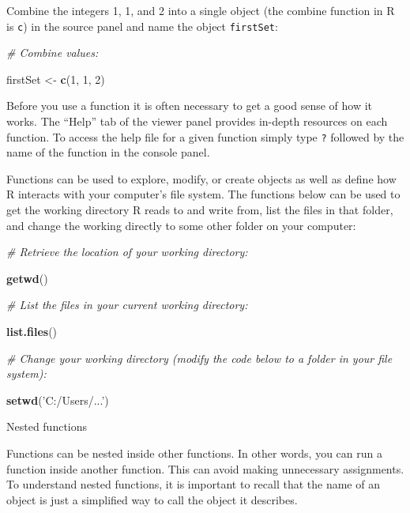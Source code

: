 \documentclass[]{article}
\newenvironment{Shaded}{\begin{snugshade}}{\end{snugshade}}
\newcommand{\KeywordTok}[1]{\textcolor[rgb]{0.13,0.29,0.53}{\textbf{#1}}}
\newcommand{\DecValTok}[1]{\textcolor[rgb]{0.00,0.00,0.81}{#1}}
\newcommand{\StringTok}[1]{\textcolor[rgb]{0.31,0.60,0.02}{#1}}
\newcommand{\CommentTok}[1]{\textcolor[rgb]{0.56,0.35,0.01}{\textit{#1}}}
\newcommand{\NormalTok}[1]{#1}
\begin{document}
 Combine the integers 1, 1, and 2 into a single object (the combine
function in R is \texttt{c}) in the source panel and name the object
\texttt{firstSet}:

\begin{Shaded}
\begin{Highlighting}[]
\CommentTok{# Combine values:}

\NormalTok{firstSet <-}\StringTok{ }
\StringTok{  }\KeywordTok{c}\NormalTok{(}\DecValTok{1}\NormalTok{, }\DecValTok{1}\NormalTok{, }\DecValTok{2}\NormalTok{)}
\end{Highlighting}
\end{Shaded}

Before you use a function it is often necessary to get a good sense of
how it works. The ``Help'' tab of the viewer panel provides in-depth
resources on each function. To access the help file for a given function
simply type \texttt{?} followed by the name of the function in the
console panel.

Functions can be used to explore, modify, or create objects as well as
define how R interacts with your computer's file system. The functions
below can be used to get the working directory R reads to and write
from, list the files in that folder, and change the working directly to
some other folder on your computer:

\begin{Shaded}
\begin{Highlighting}[]
\CommentTok{# Retrieve the location of your working directory:}

\KeywordTok{getwd}\NormalTok{()}

\CommentTok{# List the files in your current working directory:}

\KeywordTok{list.files}\NormalTok{()}

\CommentTok{# Change your working directory (modify the code below to a folder in your file system):}

\KeywordTok{setwd}\NormalTok{(}\StringTok{'C:/Users/...'}\NormalTok{)}
\end{Highlighting}
\end{Shaded}

Nested functions

Functions can be nested inside other functions. In other words, you can
run a function inside another function. This can avoid making
unnecessary assignments. To understand nested functions, it is important
to recall that the name of an object is just a simplified way to call
the object it describes.
\end{document}
